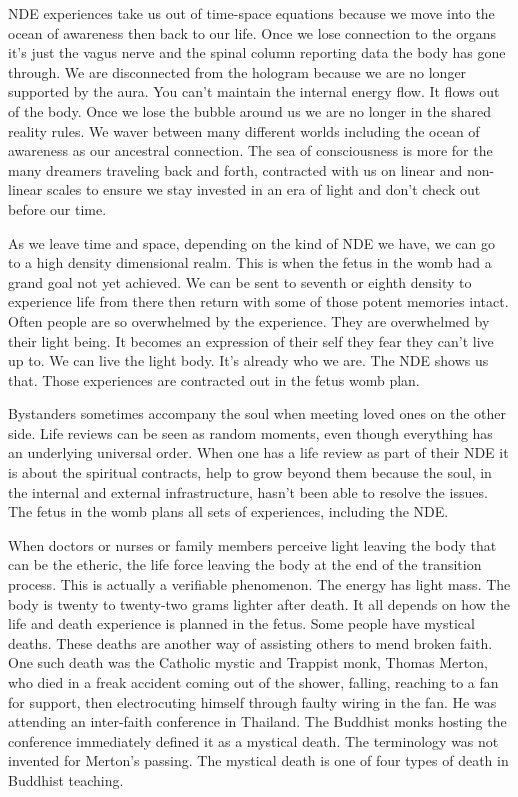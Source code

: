 NDE experiences take us out of time-space equations because we move into
the ocean of awareness then back to our life. Once we lose connection to
the organs it's just the vagus nerve and the spinal column reporting
data the body has gone through. We are disconnected from the hologram
because we are no longer supported by the aura. You can't maintain the
internal energy flow. It flows out of the body. Once we lose the bubble
around us we are no longer in the shared reality rules. We waver between
many different worlds including the ocean of awareness as our ancestral
connection. The sea of consciousness is more for the many dreamers
traveling back and forth, contracted with us on linear and non-linear
scales to ensure we stay invested in an era of light and don't check out
before our time.

As we leave time and space, depending on the kind of NDE we have, we can
go to a high density dimensional realm. This is when the fetus in the
womb had a grand goal not yet achieved. We can be sent to seventh or
eighth density to experience life from there then return with some of
those potent memories intact. Often people are so overwhelmed by the
experience. They are overwhelmed by their light being. It becomes an
expression of their self they fear they can't live up to. We can live
the light body. It's already who we are. The NDE shows us that. Those
experiences are contracted out in the fetus womb plan.

Bystanders sometimes accompany the soul when meeting loved ones on the
other side. Life reviews can be seen as random moments, even though
everything has an underlying universal order. When one has a life review
as part of their NDE it is about the spiritual contracts, help to grow
beyond them because the soul, in the internal and external
infrastructure, hasn't been able to resolve the issues. The fetus in the
womb plans all sets of experiences, including the NDE.

When doctors or nurses or family members perceive light leaving the body
that can be the etheric, the life force leaving the body at the end of
the transition process. This is actually a verifiable phenomenon. The
energy has light mass. The body is twenty to twenty-two grams lighter
after death. It all depends on how the life and death experience is
planned in the fetus. Some people have mystical deaths. These deaths are
another way of assisting others to mend broken faith. One such death was
the Catholic mystic and Trappist monk, Thomas Merton, who died in a
freak accident coming out of the shower, falling, reaching to a fan for
support, then electrocuting himself through faulty wiring in the fan. He
was attending an inter-faith conference in Thailand. The Buddhist monks
hosting the conference immediately defined it as a mystical death. The
terminology was not invented for Merton's passing. The mystical death is
one of four types of death in Buddhist teaching.

